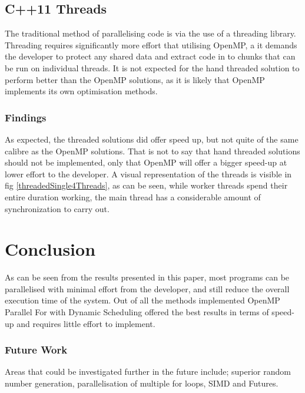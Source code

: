 \documentclass[journal,transmag]{IEEEtran}
\begin{document}
	\subsection{C++11 Threads}
		The traditional method of parallelising code is via the use of a threading library. Threading requires significantly more effort that utilising OpenMP, a it demands the developer to protect any shared data and extract code in to chunks that can be run on individual threads. It is not expected for the hand threaded solution to perform better than the OpenMP solutions, as it is likely that OpenMP implements its own optimisation methods.
		\subsubsection{Findings}
		As expected, the threaded solutions did offer speed up, but not quite of the same calibre as the OpenMP solutions. That is not to say that hand threaded solutions should not be implemented, only that OpenMP will offer a bigger speed-up at lower effort to the developer.
		A visual representation of the threads is visible in fig \ref{threadedSingle4Threads}, as can be seen, while worker threads spend their entire duration working, the main thread has a considerable amount of synchronization to carry out.
	\newpage
\section{Conclusion}
	As can be seen from the results presented in this paper, most programs can be parallelised  with minimal effort from the developer, and still reduce the overall execution time of the system. Out of all the methods implemented OpenMP Parallel For with Dynamic Scheduling offered the best results in terms of speed-up and requires little effort to implement.
	
	\subsubsection{Future Work}
		Areas that could be investigated further in the future include; superior random number generation, parallelisation of multiple for loops, SIMD and Futures.
	

	\appendices

\renewcommand\refname{Bibliography}


\nocite{Williams:1483005}
\end{document}
